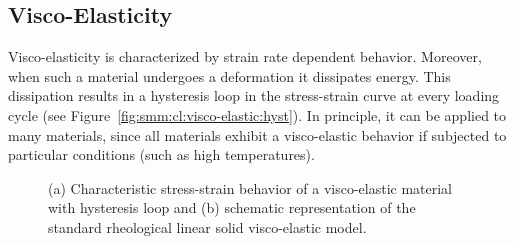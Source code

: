 \subsection{Visco-Elasticity}
Visco-elasticity is characterized by strain rate dependent
behavior. Moreover, when such a material undergoes a deformation it
dissipates energy. This dissipation results in a hysteresis loop in
the stress-strain curve at every loading cycle (see
Figure~\ref{fig:smm:cl:visco-elastic:hyst}). In principle, it can be
applied to many materials, since all materials exhibit a visco-elastic
behavior if subjected to particular conditions (such as high
temperatures).
\begin{figure}[!htb]
  \begin{center}

    \hspace{0.05\textwidth}
    \caption{(a) Characteristic stress-strain behavior of a visco-elastic material with hysteresis loop and (b) schematic representation of the standard rheological linear solid visco-elastic model.}
    \label{fig:smm:cl:visco-elastic}
  \end{center}
\end{figure}
